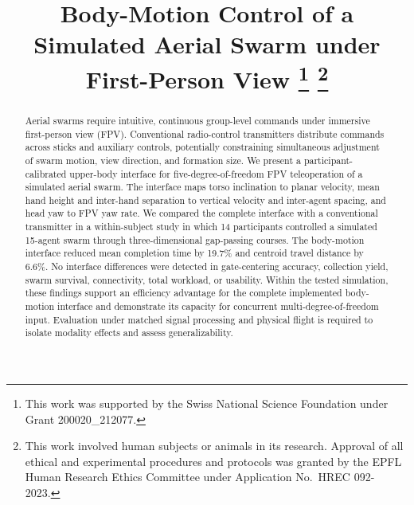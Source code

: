 \documentclass[conference, a4paper]{IEEEtran}
\begin{document}
\title{Body-Motion Control of a Simulated Aerial Swarm under First-Person View
\thanks{This work was supported by the Swiss National Science Foundation under Grant 200020\_212077.}
\thanks{This work involved human subjects or animals in its research. Approval of all ethical and experimental procedures and protocols was granted by the EPFL Human Research Ethics Committee under Application No.\ HREC 092-2023.}
}

\author{
}

\maketitle

\begin{abstract}
Aerial swarms require intuitive, continuous group-level commands under
immersive first-person view (FPV). Conventional radio-control transmitters
distribute commands across sticks and auxiliary controls, potentially
constraining simultaneous adjustment of swarm motion, view direction, and
formation size. We present a participant-calibrated upper-body interface for
five-degree-of-freedom FPV teleoperation of a simulated aerial swarm. The
interface maps torso inclination to planar velocity, mean hand height and
inter-hand separation to vertical velocity and inter-agent spacing, and head
yaw to FPV yaw rate. We compared the complete interface with a conventional
transmitter in a within-subject study in which 14 participants controlled a
simulated 15-agent swarm through three-dimensional gap-passing courses. The
body-motion interface reduced mean completion time by 19.7\% and centroid
travel distance by 6.6\%. No interface differences were detected in gate-centering accuracy, collection
yield, swarm survival, connectivity, total workload, or usability. Within the
tested simulation, these findings support an efficiency advantage for the
complete implemented body-motion interface and demonstrate its capacity for
concurrent multi-degree-of-freedom input. Evaluation under matched signal
processing and physical flight is required to isolate modality effects and
assess generalizability.
\end{abstract}
\end{document}
